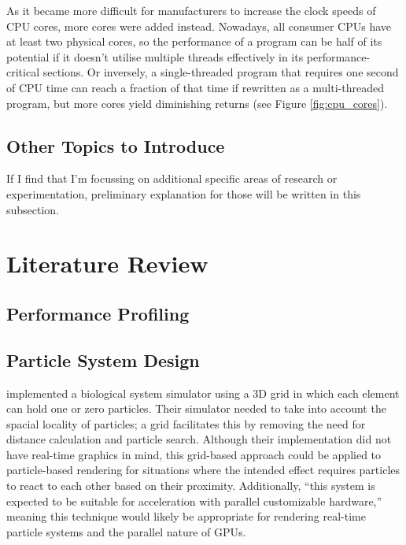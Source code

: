 \documentclass[11pt, a4paper, twocolumn]{article}
\begin{document}
As it became more difficult for manufacturers to increase the clock speeds of CPU cores, more cores were added instead. Nowadays, all consumer CPUs have at least two physical cores, so the performance of a program can be half of its potential if it doesn't utilise multiple threads effectively in its performance-critical sections. Or inversely, a single-threaded program that requires one second of CPU time can reach a fraction of that time if rewritten as a multi-threaded program, but more cores yield diminishing returns (see Figure \ref{fig:cpu_cores}).


\subsection{Other Topics to Introduce}

If I find that I'm focussing on additional specific areas of research or experimentation, preliminary explanation for those will be written in this subsection.

\section{Literature Review}

\subsection{Performance Profiling}

\subsection{Particle System Design}


\citet{Boulianne2007} implemented a biological system simulator using a 3D grid in which each element can hold one or zero particles. Their simulator needed to take into account the spacial locality of particles; a grid facilitates this by removing the need for distance calculation and particle search. Although their implementation did not have real-time graphics in mind, this grid-based approach could be applied to particle-based rendering for situations where the intended effect requires particles to react to each other based on their proximity. Additionally, ``this system is expected to be suitable for acceleration with parallel customizable hardware,'' \citep{Boulianne2007} meaning this technique would likely be appropriate for rendering real-time particle systems and the parallel nature of GPUs.
\end{document}
